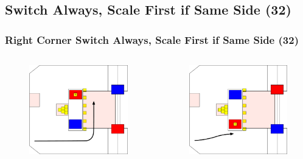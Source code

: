 \documentclass{beamer}
\begin{document}
\subsection{Switch Always, Scale First if Same Side (32)}

\begin{frame}
 \frametitle{Right Corner Switch Always, Scale First if Same Side \alert{(32)}}
 \begin{columns}
  \begin{figure}
   \includegraphics[scale=0.15]{assets/paths/32_LR}
  \end{figure}
  \begin{figure}
   \includegraphics[scale=0.15]{assets/paths/32_RL}

\end{figure}
\end{columns}
\end{frame}
\end{document}

